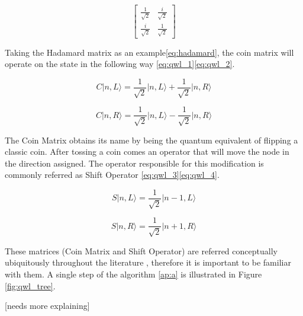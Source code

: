 \begin{equation}
\label{eq:qwl_symmetric}
\left[\begin{array}{cc}
\frac{1}{\sqrt{2}} & \frac{i}{\sqrt{2}}\\
\frac{i}{\sqrt{2}} & \frac{1}{\sqrt{2}}
\end{array}\right]
\end{equation}

Taking the Hadamard matrix as an example\ref{eq:hadamard}, the coin matrix will operate on the state in the following way \ref{eq:qwl_1}\ref{eq:qwl_2}\cite{Ambainis}.

\begin{equation}
\label{eq:qwl_1}
C\vert n, L\rangle = \frac{1}{\sqrt{2}} \vert n, L\rangle + \frac{1}{\sqrt{2}} \vert n, R\rangle
\end{equation}
  
\begin{equation}
\label{eq:qwl_2}
C\vert n, R\rangle = \frac{1}{\sqrt{2}} \vert n, L\rangle - \frac{1}{\sqrt{2}} \vert n, R\rangle
\end{equation} 

The Coin Matrix obtains its name by being the quantum equivalent of flipping a classic coin. After tossing a coin comes an operator that will move the node in the direction assigned. The operator responsible for this modification is commonly referred as Shift Operator \ref{eq:qwl_3}\ref{eq:qwl_4}. 

\begin{equation}
\label{eq:qwl_3}
S\vert n, L\rangle = \frac{1}{\sqrt{2}} \vert n-1, L\rangle
\end{equation}

\begin{equation}
\label{eq:qwl_4}
S\vert n, R\rangle = \frac{1}{\sqrt{2}} \vert n+1, R\rangle
\end{equation} 

These matrices (Coin Matrix and Shift Operator) are referred conceptually ubiquitously throughout the literature \cite{SAUCES}, therefore it is important to be familiar with them. A single step of the algorithm \ref{ap:a} is illustrated in Figure \ref{fig:qwl_tree}.

[needs more explaining]

